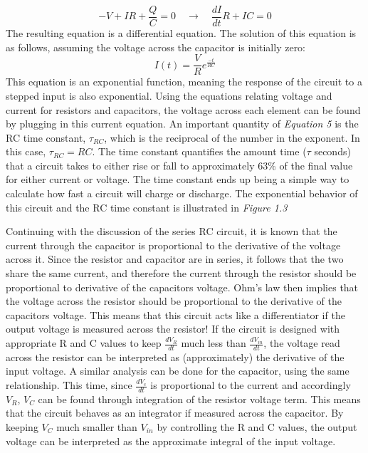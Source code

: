 \documentclass[12pt]{article}
\begin{document}
\begin{equation}
-V + IR + \frac{Q}{C} = 0 \hspace{12pt}\longrightarrow\hspace{12pt} \frac{dI}{dt}R + IC = 0
\end{equation}
The resulting equation is a differential equation. The solution of this equation is as follows, assuming the voltage across the capacitor is initially zero:
\begin{equation}
I(t) = \frac{V}{R}e^{\frac{-t}{RC}}
\end{equation}
This equation is an exponential function, meaning the response of the circuit to a stepped input is also exponential. Using the equations relating voltage and current for resistors and capacitors, the voltage across each element can be found by plugging in this current equation. An important quantity of \textit{Equation 5} is the RC time constant, $\tau_{RC}$, which is the reciprocal of the number in the exponent. In this case, $\tau_{RC}=RC$. The time constant quantifies the amount time ($\tau$ seconds) that a circuit takes to either rise or fall to approximately 63\% of the final value for either current or voltage. The time constant ends up being a simple way to calculate how fast a circuit will charge or discharge. The exponential behavior of this circuit and the RC time constant is illustrated in \textit{Figure 1.3}\par
%
\begin{center}
    	\resizebox{0.6\textwidth}{!}{}
\end{center}
Continuing with the discussion of the series RC circuit, it is known that the current through the capacitor is proportional to the derivative of the voltage across it. Since the resistor and capacitor are in series, it follows that the two share the same current, and therefore the current through the resistor should be proportional to derivative of the capacitors voltage. Ohm's law then implies that the voltage across the resistor should be proportional to the derivative of the capacitors voltage. This means that this circuit acts like a differentiator if the output voltage is measured across the resistor! If the circuit is designed with appropriate R and C values to keep $\frac{dV_R}{dt}$ much less than $\frac{dV_{in}}{dt}$, the voltage read across the resistor can be interpreted as (approximately) the derivative of the input voltage. A similar analysis can be done for the capacitor, using the same relationship. This time, since $\frac{dV_c}{dt}$ is proportional to the current and accordingly $V_R$, $V_C$ can be found through integration of the resistor voltage term. This means that the circuit behaves as an integrator if  measured across the capacitor. By keeping $V_C$ much smaller than $V_{in}$ by controlling the R and C values, the output voltage can be interpreted as the approximate integral of the input voltage.\par\vspace{12pt}
\end{document}

